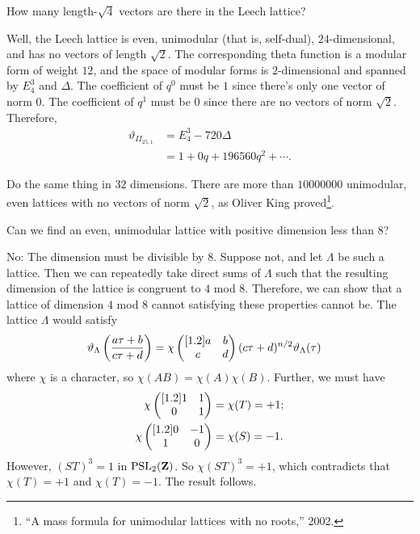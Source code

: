\documentclass[11pt, oneside,margin=1in]{article}
\begin{document}
\begin{problem}
	How many length-$\sqrt{4} $ vectors are there in the Leech lattice?
\end{problem}

Well, the Leech lattice is even, unimodular (that is, self-dual), $24$-dimensional, and has no vectors of length $\sqrt{2} $. The corresponding theta function is a modular form of weight $12$, and the space of modular forms is $2$-dimensional and spanned by $E_4^3$ and $\Delta$. The coefficient of $q^0$ must be $1$ since there's only one vector of norm $0$. The coefficient of $q^1$ must be $0$ since there are no vectors of norm $\sqrt{2} $. Therefore,
\begin{align*}
	\vartheta _{II_{25,1}} &= E_4^3 - 720\Delta\\
			       &= 1 + 0q + 196560q^2 + \cdots.
\end{align*}

\begin{exercise}\label{}\text{}
Do the same thing in $32$ dimensions. There are more than $10000000$ unimodular, even lattices with no vectors of norm $\sqrt{2} $, as Oliver King proved\footnote{``A mass formula for unimodular lattices with no roots,'' 2002.}.
\end{exercise}

\begin{problem}
	Can we find an even, unimodular lattice with positive dimension less than $8$?
\end{problem}

No: The dimension must be divisible by $8$. Suppose not, and let $\Lambda$ be such a lattice. Then we can repeatedly take direct sums of $\Lambda$ such that the resulting dimension of the lattice is congruent to $4$ mod $8$. Therefore, we can show that a lattice of dimension $4$ mod $8$ cannot satisfying these properties cannot be. The lattice $\Lambda$ would satisfy
\begin{align*}
	\vartheta_{\Lambda } \left( \frac{a\tau + b}{c\tau + d} \right) &= \chi \begin{pmatrix} [ 1.2 ] a&b\\c&d\end{pmatrix} (c\tau + d)^{n/2} \vartheta_{\Lambda } (\tau)
\end{align*}
where $\chi$ is a character, so $\chi(AB) = \chi (A)\chi  (B)$. Further, we must have
\begin{align*}
	\chi \begin{pmatrix} [ 1.2 ] 1&1\\0&1\end{pmatrix} &= \chi(T) = +1;\\
	\chi\begin{pmatrix} [ 1.2 ] 0&-1\\1&0\end{pmatrix} &=\chi(S) = -1.
\end{align*}
However, $(ST)^3 = 1$ in $\operatorname{PSL}_{2}(\mathbf Z)$. So $\chi(ST)^3 =+1$, which contradicts that $\chi(T)=+1$ and $\chi(T)=-1$. The result follows. 
\end{document}
